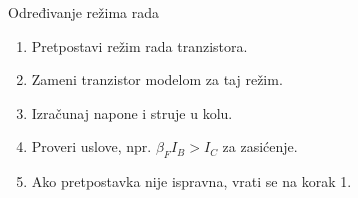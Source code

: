 \begin{frame}[label=10-s007]{Određivanje režima rada}
\setlength{\abovedisplayskip}{4pt}\setlength{\belowdisplayskip}{4pt}\setlength{\abovedisplayshortskip}{3pt}\setlength{\belowdisplayshortskip}{3pt}
\begin{enumerate}
\item Pretpostavi režim rada tranzistora.
\item Zameni tranzistor modelom za taj režim.
\item Izračunaj napone i struje u kolu.
\item Proveri uslove, npr. $\beta_F I_B>I_C$ za zasićenje.
\item Ako pretpostavka nije ispravna, vrati se na korak 1.
\end{enumerate}\bigskip
{}
\end{frame}

